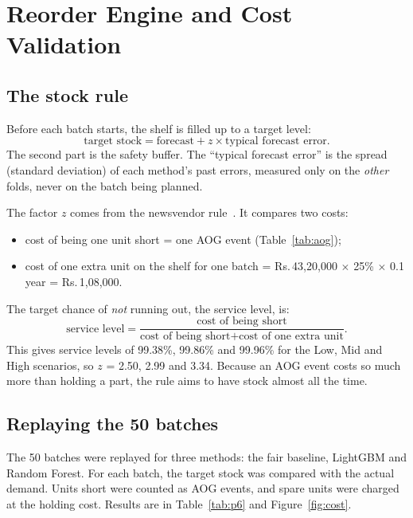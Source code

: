 \documentclass[12pt,oneside]{report}
\newcommand{\INR}{Rs.\,}
\newcommand{\gl}[2]{\phantomsection\label{gl:#1}#2}
\begin{document}
\chapter{Reorder Engine and Cost Validation}
\label{ch:reorder}

\section{The stock rule}
Before each batch starts, the shelf is filled up to a target level:
\[
\text{target stock} = \text{forecast} + z \times \text{typical forecast error}.
\]
The second part is the \gl{buffer}{safety buffer}. The ``typical forecast error'' is the spread (standard deviation) of each method's past errors, measured only on the \emph{other} folds, never on the batch being planned.

The factor $z$ comes from the \gl{newsvendor}{newsvendor rule}~\cite{silver2017}. It compares two costs:
\begin{itemize}
\item cost of being one unit short = one AOG event (Table~\ref{tab:aog});
\item cost of one extra unit on the shelf for one batch = \INR 43,20,000 $\times$ 25\% $\times$ 0.1 year = \INR 1,08,000.
\end{itemize}
The target chance of \emph{not} running out, the \gl{service}{service level}, is:
\[
\text{service level} = \frac{\text{cost of being short}}{\text{cost of being short} + \text{cost of one extra unit}}.
\]
This gives service levels of 99.38\%, 99.86\% and 99.96\% for the Low, Mid and High scenarios, so $z$ = 2.50, 2.99 and 3.34. Because an AOG event costs so much more than holding a part, the rule aims to have stock almost all the time.

\section{Replaying the 50 batches}
The 50 batches were replayed for three methods: the fair baseline, LightGBM and Random Forest. For each batch, the target stock was compared with the actual demand. Units short were counted as AOG events, and spare units were charged at the holding cost. Results are in Table~\ref{tab:p6} and Figure~\ref{fig:cost}.
\end{document}
